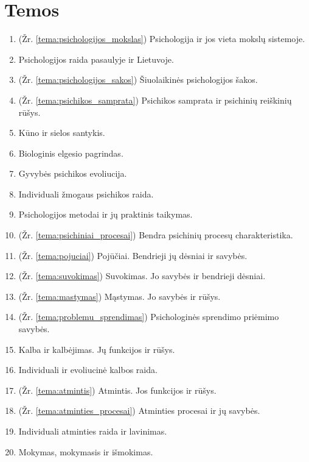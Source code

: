 \chapter{Temos}

\begin{enumerate}
  \item \label{tema_01} (Žr. \ref{tema:psichologijos_mokslas})
    Psichologija ir jos vieta mokslų sistemoje.
  \item \label{tema_02} Psichologijos raida pasaulyje ir Lietuvoje.
  \item \label{tema_03} (Žr. \ref{tema:psichologijos_sakos})
    Šiuolaikinės psichologijos šakos.
  \item \label{tema_04} (Žr. \ref{tema:psichikos_samprata})
    Psichikos samprata ir psichinių reiškinių rūšys.
  \item \label{tema_05} Kūno ir sielos santykis.
  \item \label{tema_06} Biologinis elgesio pagrindas.
  \item \label{tema_07} Gyvybės psichikos evoliucija.
  \item \label{tema_10} Individuali žmogaus psichikos raida.
  \item \label{tema_11} Psichologijos metodai ir jų praktinis taikymas.
  \item \label{tema_12} (Žr. \ref{tema:psichiniai_procesai})
    Bendra psichinių procesų charakteristika.
  \item \label{tema_13} (Žr. \ref{tema:pojuciai})
    Pojūčiai. Bendrieji jų dėsniai ir savybės.
  \item \label{tema_14} (Žr. \ref{tema:suvokimas})
    Suvokimas. Jo savybės ir bendrieji dėsniai.
  \item \label{tema_15} (Žr. \ref{tema:mastymas})
    Mąstymas. Jo savybės ir rūšys.
  \item \label{tema_16} (Žr. \ref{tema:problemu_sprendimas})
    Psichologinės sprendimo priėmimo savybės.
  \item \label{tema_17} Kalba ir kalbėjimas. Jų funkcijos ir rūšys.
  \item \label{tema_20} Individuali ir evoliucinė kalbos raida.
  \item \label{tema_21} (Žr. \ref{tema:atmintis})
    Atmintis. Jos funkcijos ir rūšys.
  \item \label{tema_22} (Žr. \ref{tema:atminties_procesai})
    Atminties procesai ir jų savybės.
  \item \label{tema_23} Individuali atminties raida ir lavinimas.
  \item \label{tema_24} Mokymas, mokymasis ir išmokimas.

\end{enumerate}
